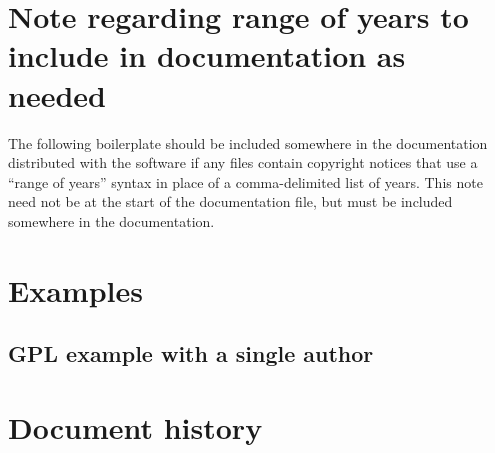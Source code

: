 \documentclass[10pt,a4paper]{article}
\begin{document}
\section{Note regarding range of years to include in documentation as needed}
\label{appendix:range.of.years}
The following boilerplate should be included somewhere in the 
documentation distributed with the software if any files contain copyright 
notices that use a ``range of years'' syntax in place of a comma-delimited 
list of years. This note need not be at the start of the documentation file, 
but must be included somewhere in the documentation. 

\begin{boilerplate}

\end{boilerplate}



\section{Examples}
\label{appendix:examples}

\subsection{GPL example with a single author}
\begin{boilerplate}

\end{boilerplate}




\section*{Document history}
\end{document}
